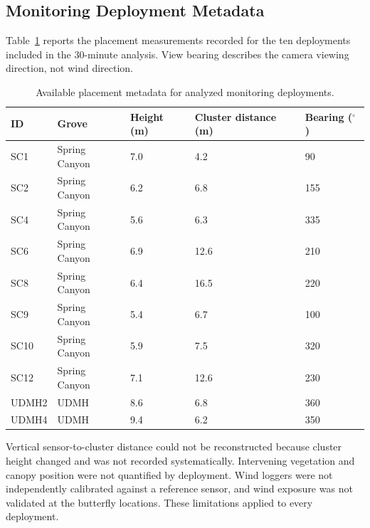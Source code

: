 \documentclass[insects,article,submit,pdftex,moreauthors]{Definitions/mdpi}
\begin{document}

\appendixstart
\begin{appendix}

\section{Monitoring Deployment Metadata}
\label{app:deployment_metadata}

Table~\ref{tab:deployment_metadata} reports the placement measurements recorded for the ten deployments included in the 30-minute analysis. View bearing describes the camera viewing direction, not wind direction.

\begin{table}[H]
\caption{Available placement metadata for analyzed monitoring deployments.}
\label{tab:deployment_metadata}
\begin{tabularx}{\textwidth}{@{}p{}p{}p{}p{}X@{}}
\toprule
\textbf{ID} & \textbf{Grove} & \textbf{Height (m)} & \textbf{Cluster distance (m)} & \textbf{Bearing ($^{\circ}$)} \\
\midrule
SC1 & Spring Canyon & 7.0 & 4.2 & 90 \\
SC2 & Spring Canyon & 6.2 & 6.8 & 155 \\
SC4 & Spring Canyon & 5.6 & 6.3 & 335 \\
SC6 & Spring Canyon & 6.9 & 12.6 & 210 \\
SC8 & Spring Canyon & 6.4 & 16.5 & 220 \\
SC9 & Spring Canyon & 5.4 & 6.7 & 100 \\
SC10 & Spring Canyon & 5.9 & 7.5 & 320 \\
SC12 & Spring Canyon & 7.1 & 12.6 & 230 \\
UDMH2 & UDMH & 8.6 & 6.8 & 360 \\
UDMH4 & UDMH & 9.4 & 6.2 & 350 \\
\bottomrule
\end{tabularx}
\end{table}

Vertical sensor-to-cluster distance could not be reconstructed because cluster height changed and was not recorded systematically. Intervening vegetation and canopy position were not quantified by deployment. Wind loggers were not independently calibrated against a reference sensor, and wind exposure was not validated at the butterfly locations. These limitations applied to every deployment.


\end{appendix}
\end{document}
